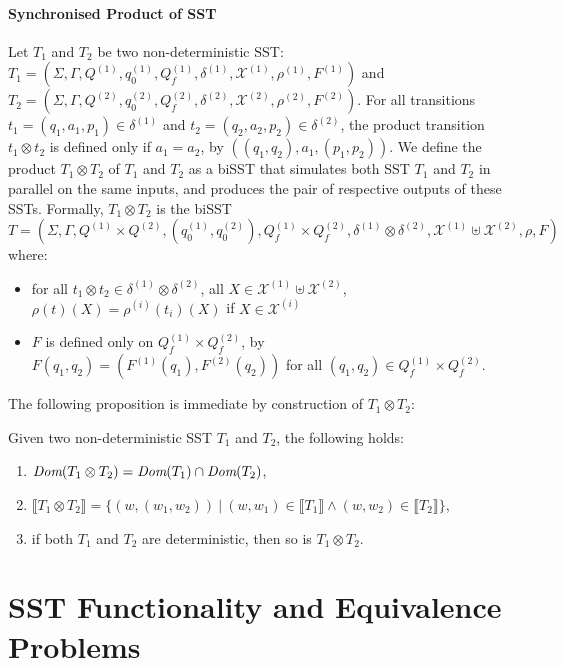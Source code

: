 \documentclass{llncs}
\newcommand\inter[1]{\llbracket #1 \rrbracket}
\newcommand{\Vars}{\mathcal{X}}
\begin{document}
\paragraph{Synchronised Product of SST} Let $T_1$ and $T_2$  be two non-deterministic
SST: $T_1 {=} (\Sigma, \Gamma, Q^{(1)},  q_0^{(1)}, \allowbreak Q_f^{(1)},
\delta^{(1)}, \Vars^{(1)}, \rho^{(1)}, F^{(1)})$ and $T_2 = (\Sigma, \Gamma, Q^{(2)}, q_0^{(2)}, Q_f^{(2)},
\delta^{(2)},\allowbreak \Vars^{(2)}, \rho^{(2)}, F^{(2)})$. For all
transitions $t_1 = (q_1,a_1,p_1)\in \delta^{(1)}$ and $t_2 =
(q_2,a_2,p_2)\in \delta^{(2)}$, the product transition $t_1\otimes
t_2$ is defined only if $a_1=a_2$, by $((q_1,q_2),a_1,(p_1,p_2))$. 
We define the product $T_1\otimes T_2$ of $T_1$
and $T_2$ as a biSST that simulates both SST $T_1$ and $T_2$ in
parallel on the same inputs, and produces the pair of respective outputs
of these SSTs. Formally, $T_1\otimes T_2$ is the biSST
$T = (\Sigma, \Gamma, Q^{(1)}\times Q^{(2)}, (q_0^{(1)},q_0^{(2)}),
Q_f^{(1)}\times Q_f^{(2)}, \delta^{(1)}\otimes \delta^{(2)}, \Vars^{(1)}\uplus \Vars^{(2)},
\rho, F)$ where:
\begin{itemize}
    \item for all $t_1\otimes t_2\in\delta^{(1)}\otimes \delta^{(2)}$, all $X\in \Vars^{(1)}\uplus
      \Vars^{(2)}$, $\rho(t)(X) = \rho^{(i)}(t_i)(X)$ if $X\in
      \Vars^{(i)}$
    \item $F$ is defined only on $Q_f^{(1)}\times Q_f^{(2)}$, by
      $F(q_1,q_2) = (F^{(1)}(q_1),F^{(2)}(q_2))$ for all $(q_1,q_2)\in
      Q_f^{(1)}\times Q_f^{(2)}$.
\end{itemize}

The following proposition is immediate by construction of $T_1\otimes T_2$:
\begin{proposition}
Given two non-deterministic SST $T_1$ and $T_2$, the following holds:
\begin{enumerate}
\item $\textit{Dom}(T_1\otimes T_2) = \textit{Dom}(T_1)\cap \textit{Dom}(T_2)$, 
\item $\inter{T_1\otimes T_2} = \{ (w,(w_1,w_2))\ |\ (w,w_1)\in
\inter{T_1}\wedge (w,w_2)\in \inter{T_2}\}$, 
\item if both $T_1$ and $T_2$ are deterministic, then so is
  $T_1\otimes T_2$. 
\end{enumerate}
\end{proposition}



\section{SST Functionality and Equivalence Problems}
\label{sec:prelims}
\end{document}

